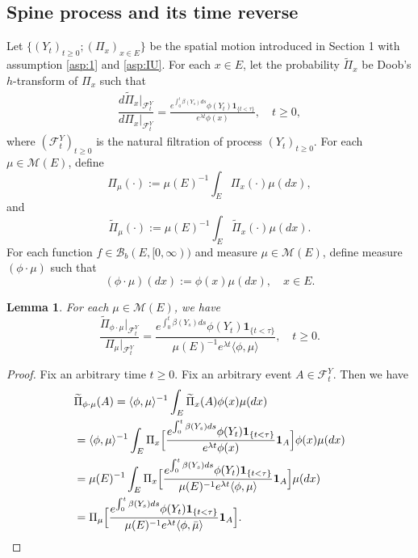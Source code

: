 \documentclass[12pt,a4paper]{amsart}
\numberwithin{equation}{section}
\theoremstyle{plain}
\newtheorem{lem}[thm]{Lemma}
\theoremstyle{definition}
\begin{document}
\subsection{Spine process and its time reverse}
Let $\{(Y_t)_{t\geq 0}; (\Pi_x)_{x\in E}\}$ be the spatial motion introduced in Section 1 with assumption \ref{asp:1} and \ref{asp:IU}.
For each $x\in E$, let the probability $\widetilde \Pi_{x}$ be Doob's $h$-transform of $\Pi_x$ such that
\begin{align}
	\dfrac{d\widetilde{\Pi}_x|_{\mathscr F^Y_t}}{d\Pi_x|_{\mathscr F^Y_t}}= \frac{e^{\int_0^t \beta(Y_s)ds}\phi(Y_t) \mathbf 1_{\{t<\tau\}}}{e^{\lambda t}\phi(x)},
	\quad t\geq 0,
\end{align}
where $(\mathscr F_t^Y)_{t\geq 0}$ is the natural filtration of process $(Y_t)_{t\geq 0}$.
For each $\mu \in \mathcal M(E)$, define
\[
	\Pi_{\mu}(\cdot)
	:= \mu(E)^{-1}\int_{E} \Pi_x(\cdot)\mu(dx),
\]
and
\[
	\widetilde\Pi_{\mu}(\cdot):= \mu(E)^{-1} \int_E\widetilde\Pi_x(\cdot)\mu(dx).
\]
For each function $f \in \mathcal B_b(E,[0,\infty))$ and measure $\mu \in \mathcal M(E)$, define measure $(\phi \cdot\mu)$ such that
\[
  (\phi \cdot \mu)(dx)
  := \phi(x)\mu(dx),
  \quad x\in E.
\]
\begin{lem}
	For each $\mu\in \mathcal M(E)$, we have
 \[
    \dfrac{\widetilde \Pi_{\phi\cdot\mu}|_{\mathscr F_t^Y}}{\Pi_{\mu}|_{\mathscr F_t^Y}}
  	= \frac{e^{\int_0^t \beta(Y_s)ds}\phi(Y_t) \mathbf 1_{\{t<\tau\}}}{\mu(E)^{-1}e^{\lambda t}\langle \phi,\mu\rangle},
  	\quad t\geq 0.
  \]
\end{lem}
\begin{proof}
	Fix an arbitrary time $t\geq 0$. Fix an arbitrary event $A \in \mathscr
  F_t^Y$. Then we have
  \begin{align}
    &\widetilde{\Pi}_{\phi\cdot\mu}(A)
      = \langle\phi, \mu\rangle^{-1} \int_E \widetilde \Pi_x(A)\phi(x)\mu(dx)
    \\&=\langle\phi, \mu\rangle^{-1} \int_E  \Pi_x\Big[\frac{e^{\int_0^t \beta(Y_s)ds}\phi(Y_t) \mathbf 1_{\{t<\tau\}}}{e^{\lambda t}\phi(x)} \mathbf 1_A\Big]\phi(x)\mu(dx)
    \\&= \mu(E)^{-1}\int_E  \Pi_x\Big[\frac{e^{\int_0^t \beta(Y_s)ds}\phi(Y_t) \mathbf 1_{\{t<\tau\}}}{\mu(E)^{-1}e^{\lambda t}\langle \phi,\mu\rangle} \mathbf 1_A\Big]\mu(dx)
    \\&= \Pi_{\mu}\Big[\frac{e^{\int_0^t \beta(Y_s)ds}\phi(Y_t) \mathbf 1_{\{t<\tau\}}}{\mu(E)^{-1} e^{\lambda t}\langle \phi,\bar\mu\rangle} \mathbf 1_A\Big].
    \qedhere
  \end{align}
\end{proof}
\end{document}
